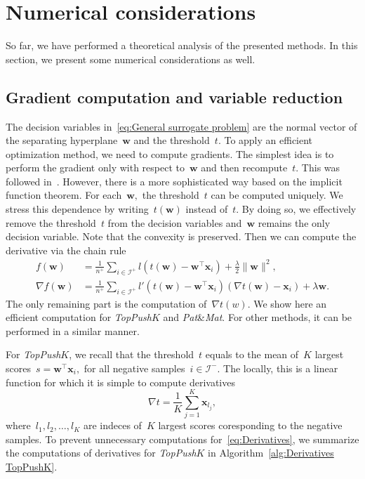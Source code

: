 \documentclass[11pt,a4paper]{article}
\theoremstyle{definition}
\newcommand{\norm}[1]{\|#1\|}
\newcommand{\I}{\mathcal{I}}
\newcommand{\toppushk}{\textit{TopPush$K$}\xspace}
\newcommand{\patmat}{\textit{Pat}\textup{\&}\textit{Mat}\xspace}
\begin{document}
\section{Numerical considerations}


So far, we have performed a theoretical analysis of the presented methods. In this section, we present some numerical considerations as well.

\subsection{Gradient computation and variable reduction}


The decision variables in~\eqref{eq:General surrogate problem} are the normal vector of the separating hyperplane~$\bm{w}$ and the threshold~$t.$ To apply an efficient optimization method, we need to compute gradients. The simplest idea is to perform the gradient only with respect to~$\bm{w}$ and then recompute~$t.$ This was followed in~\cite{grill2016learning}. However, there is a more sophisticated way based on the implicit function theorem. For each~$\bm{w},$ the threshold~$t$ can be computed uniquely. We stress this dependence by writing~$t(\bm{w})$ instead of~$t.$ By doing so, we effectively remove the threshold~$t$ from the decision variables and~$\bm{w}$ remains the only decision variable. Note that the convexity is preserved. Then we can compute the derivative via the chain rule
\begin{equation}\label{eq:Derivatives}
  \begin{aligned}
    f(\bm{w})        & = \frac{1}{n^+}\sum_{i \in \I^+} l(t(\bm{w})  - \bm{w}^\top \bm{x}_i) + \frac{\lambda}{2}\norm{\bm{w}}^2, \\
    \nabla f(\bm{w}) & = \frac{1}{n^+}\sum_{i \in \I^+} l'(t(\bm{w}) - \bm{w}^\top \bm{x}_i)(\nabla t(\bm{w}) - \bm{x}_i) + \lambda \bm{w}.
  \end{aligned}
\end{equation}
The only remaining part is the computation of~$\nabla t(w).$ We show here an efficient computation for \toppushk and \patmat. For other methods, it can be performed in a similar manner. 

For \toppushk, we recall that the threshold~$t$ equals to the mean of~$K$ largest scores~$s = \bm{w}^\top \bm{x}_i,$ for all negative samples~$i \in \I^-.$ The locally, this is a linear function for which it is simple to compute derivatives
\begin{equation*}
  \nabla t =  \frac{1}{K} \sum_{j=1}^K \bm{x}_{l_j},
\end{equation*}
where~$l_1, l_2, \dots, l_K$ are indeces of~$K$ largest scores coresponding to the negative samples. To prevent unnecessary computations for~\eqref{eq:Derivatives}, we summarize the computations of derivatives for \toppushk in Algorithm~\ref{alg:Derivatives TopPushK}.
\end{document}
